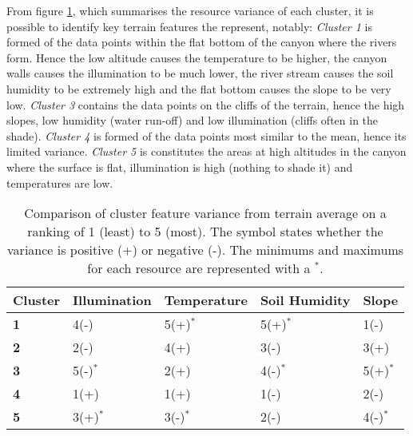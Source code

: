 From figure \ref{tab:clustering_test_cluster_variance}, which summarises the resource variance of each cluster, it is possible to identify key terrain features the represent, notably:
\textit{Cluster 1} is formed of the data points within the flat bottom of the canyon where the rivers form. Hence the low altitude causes the temperature to be higher, the canyon walls causes the illumination to be much lower, the river stream causes the soil humidity to be extremely high and the flat bottom causes the slope to be very low. \textit{Cluster 3} contains the data points on the cliffs of the terrain, hence the high slopes, low humidity (water run-off) and low illumination (cliffs often in the shade). \textit{Cluster 4} is formed of the data points most similar to the mean, hence its limited variance. \textit{Cluster 5} is constitutes the areas at high altitudes in the canyon where the surface is flat, illumination is high (nothing to shade it) and temperatures are low.\\

\begin{table}[]
  \centering
	    \begin{tabular}{|p{3cm}|p{3cm}|p{3cm}|p{3cm}|p{3cm}|}
		\hline	
  	    \textbf{Cluster} &  \textbf{Illumination} & \textbf{Temperature} & \textbf{Soil Humidity} & \textbf{Slope} \\
		\hline
		\textbf{1} & 4(-) & 5(+)$^{*}$ & 5(+)$^{*}$ & 1(-) \\
		\hline
		\textbf{2} & 2(-) & 4(+) & 3(-) & 3(+) \\
		\hline
		\textbf{3} & 5(-)$^{*}$ & 2(+) & 4(-)$^{*}$ & 5(+)$^{*}$ \\
		\hline
		\textbf{4} & 1(+) & 1(+) & 1(-) & 2(-) \\
		\hline
		\textbf{5} & 3(+)$^{*}$ & 3(-)$^{*}$ & 2(-) & 4(-)$^{*}$ \\
		\hline
		\end{tabular}
		\caption{Comparison of cluster feature variance from terrain average on a ranking of 1 (least) to 5 (most). The symbol states whether the variance is positive (+) or negative (-). The minimums and maximums for each resource are represented with a $^{*}$. }
	  \label{tab:clustering_test_cluster_variance}
\end{table}